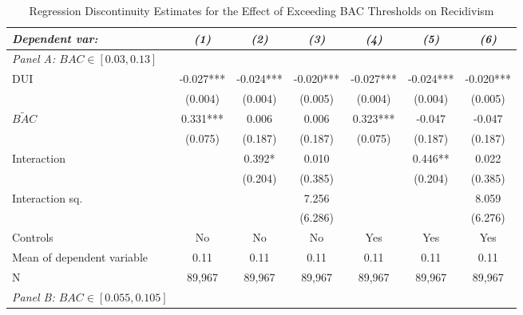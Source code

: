 \documentclass[11pt]{article}\usepackage[]{graphicx}\usepackage[]{color}
\begin{document}
\begin{enumerate}
\begin{table}[htbp]\centering
\small
\caption{Regression Discontinuity Estimates for the Effect of Exceeding BAC Thresholds on Recidivism}
\label{table:mainreg}
\begin{center}
\begin{threeparttable}
\begin{tabular}{l*{6}{c}}
\toprule
\multicolumn{1}{l}{\textit{Dependent var: }}&
\multicolumn{1}{c}{\textit{(1)}}&
\multicolumn{1}{c}{\textit{(2)}}&
\multicolumn{1}{c}{\textit{(3)}}&
\multicolumn{1}{c}{\textit{(4)}}&
\multicolumn{1}{c}{\textit{(5)}}&
\multicolumn{1}{c}{\textit{(6)}}\\
\midrule
\textit{Panel A: $BAC \in [0.03, 0.13]$ } & & & & & & \\
DUI                 &      -0.027***&      -0.024***&      -0.020***&      -0.027***&      -0.024***&      -0.020***\\
                    &     (0.004)   &     (0.004)   &     (0.005)   &     (0.004)   &     (0.004)   &     (0.005)   \\
$\tilde{BAC}$              &       0.331***&       0.006   &       0.006   &       0.323***&      -0.047   &      -0.047   \\
                    &     (0.075)   &     (0.187)   &     (0.187)   &     (0.075)   &     (0.187)   &     (0.187)   \\
Interaction         &               &       0.392*  &       0.010   &               &       0.446** &       0.022   \\
                    &               &     (0.204)   &     (0.385)   &               &     (0.204)   &     (0.385)   \\
Interaction sq.        &               &               &       7.256   &               &               &       8.059   \\
                    &               &               &     (6.286)   &               &               &     (6.276)   \\
\midrule
Controls   & No			& No			& No 	& Yes 		& Yes 		& Yes  \\
Mean of dependent variable&        0.11   &        0.11   &        0.11   &        0.11   &        0.11   &        0.11   \\
N                   &      89,967   &      89,967   &      89,967   &      89,967   &      89,967   &      89,967   \\
\midrule
\textit{Panel B: $BAC \in [0.055, 0.105]$ } & & & & & &		\\

\end{tabular}
\end{threeparttable}
\end{center}
\end{table}
\end{enumerate}
\end{document}
